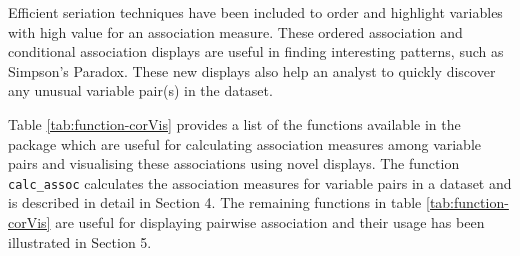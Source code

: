 Efficient seriation techniques have been included to order and highlight
variables with high value for an association measure. These ordered
association and conditional association displays are useful in finding
interesting patterns, such as Simpson's Paradox. These new displays also
help an analyst to quickly discover any unusual variable pair(s) in the
dataset.

Table \ref{tab:function-corVis} provides a list of the functions
available in the package which are useful for calculating association
measures among variable pairs and visualising these associations using
novel displays. The function \texttt{calc\_assoc} calculates the
association measures for variable pairs in a dataset and is described in
detail in Section 4. The remaining functions in table
\ref{tab:function-corVis} are useful for displaying pairwise association
and their usage has been illustrated in Section 5.


